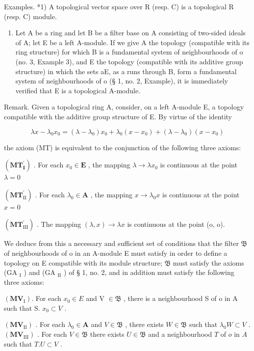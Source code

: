 Examples. *1) A topological vector space over R (resp. C) is a topological R (resp. C) module.

\begin{enumerate}
\def\labelenumi{\arabic{enumi})}
\setcounter{enumi}{1}
\tightlist
\item
  Let A be a ring and let B be a filter base on A consisting of two-sided ideals of A; let E be a left A-module. If we give A the topology (compatible with its ring structure) for which B is a fundamental system of neighbourhoods of o (no. 3, Example 3), and E the topology (compatible with its additive group structure) in which the sets aE, as a runs through B, form a fundamental system of neighbourhoods of o (§ 1, no. 2, Example), it is immediately verified that E is a topological A-module.
\end{enumerate}

Remark. Given a topological ring A, consider, on a left A-module E, a topology compatible with the additive group structure of E. By virtue of the identity

\[
\lambda x - \lambda_ {0} x _ {0} = (\lambda - \lambda_ {0}) x _ {0} + \lambda_ {0} (x - x _ {0}) + (\lambda - \lambda_ {0}) (x - x _ {0})
\]

the axiom (MT) is equivalent to the conjunction of the following three axioms:

\((\mathbf{MT}_{\mathbf{I}}^{\prime})\) . For each \(x_0\in \mathbf{E}\) , the mapping \(\lambda \to \lambda x_0\) is continuous at the point \(\lambda = 0\)

\((\mathbf{MT}_{\mathrm{II}}^{\prime})\) . For each \(\lambda_0\in \mathbf{A}\) , the mapping \(x\to \lambda_0x\) is continuous at the point \(x = 0\)

\((\mathbf{MT}_{\mathrm{III}}^{\prime})\) . The mapping \((\lambda ,x)\to \lambda x\) is continuous at the point (o, o).

We deduce from this a necessary and sufficient set of conditions that the filter \(\mathfrak{B}\) of neighbourhoods of o in an A-module E must satisfy in order to define a topology on E compatible with its module structure; \(\mathfrak{B}\) must satisfy the axioms (GA \(_{\mathrm{I}}\) ) and (GA \(_{\mathrm{II}}\) ) of § 1, no. 2, and in addition must satisfy the following three axioms:

\((\mathbf{MV}_{\mathrm{I}})\). For each \(x_0 \in E\) and V \(\in \mathfrak{B}\) , there is a neighbourhood S of o in A such that S. \(x_0 \subset V\) .

\((\mathbf{MV}_{\mathrm{II}})\) . For each \(\lambda_0 \in \mathbf{A}\) and \(V \in \mathfrak{B}\) , there exists \(W \in \mathfrak{B}\) such that \(\lambda_0 W \subset V\) . \((\mathbf{MV}_{\mathrm{III}})\) . For each \(V \in \mathfrak{B}\) there exists \(U \in \mathfrak{B}\) and a neighbourhood \(T\) of \(o\) in \(A\) such that \(T. U \subset V\) .

